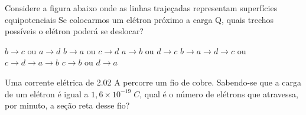 \documentclass[12pt, addpoints]{exam}
\begin{document}
    \begin{questions}
\begin{multicols*}{2}
\question Considere a figura abaixo onde as linhas trajeçadas representam superfícies equipotenciais Se colocarmos um elétron próximo a carga Q, quais trechos possíveis o elétron poderá se deslocar?
        
        \begin{center}
            \begin{minipage}[c]{0.5\linewidth}
            \end{minipage}
        \end{center}
        
        

\begin{choices}
\choice $b\rightarrow c$ ou $a\rightarrow d$ 
\choice $b\rightarrow a$ ou $c\rightarrow d$ 
\choice $a\rightarrow b$ ou $d\rightarrow c$ 
\choice $b\rightarrow a\rightarrow d\rightarrow c$ ou $c\rightarrow d\rightarrow a\rightarrow b$ 
\choice $c\rightarrow b$ ou $d\rightarrow a$ 
\end{choices}
\question Uma corrente elétrica de    2.02 A percorre um ﬁo de cobre. Sabendo-se que a carga de um elétron é igual a $1,6\times 10^{-19}\;C$, qual é o número de elétrons que atravessa, por minuto, a seção reta desse ﬁo?


\end{multicols*}
\end{questions}
\end{document}

